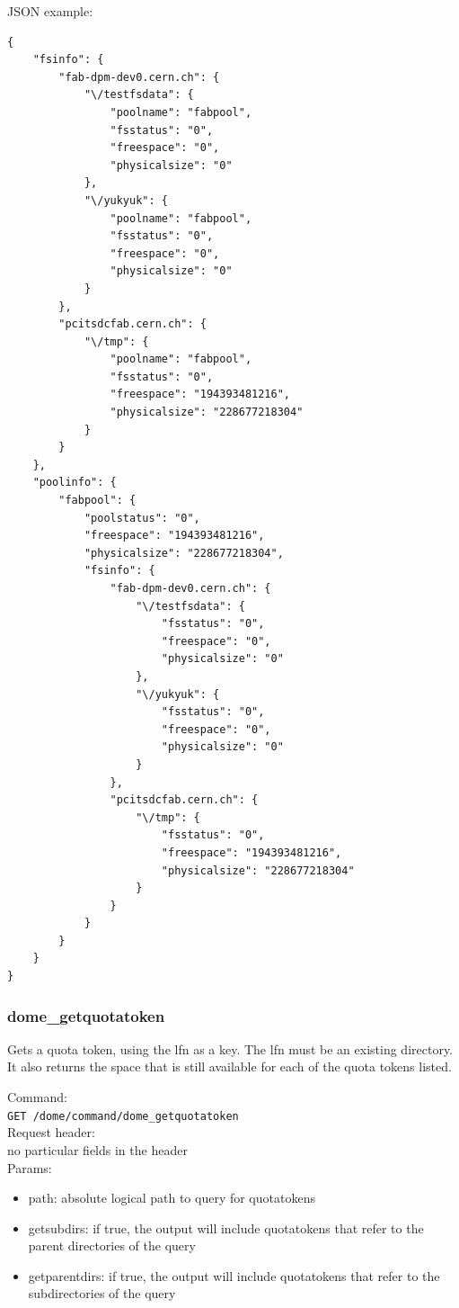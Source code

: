 \documentclass[a4paper,10pt]{scrreprt}
\begin{document}
JSON example:\\
\begin{lstlisting}
{
    "fsinfo": {
        "fab-dpm-dev0.cern.ch": {
            "\/testfsdata": {
                "poolname": "fabpool",
                "fsstatus": "0",
                "freespace": "0",
                "physicalsize": "0"
            },
            "\/yukyuk": {
                "poolname": "fabpool",
                "fsstatus": "0",
                "freespace": "0",
                "physicalsize": "0"
            }
        },
        "pcitsdcfab.cern.ch": {
            "\/tmp": {
                "poolname": "fabpool",
                "fsstatus": "0",
                "freespace": "194393481216",
                "physicalsize": "228677218304"
            }
        }
    },
    "poolinfo": {
        "fabpool": {
            "poolstatus": "0",
            "freespace": "194393481216",
            "physicalsize": "228677218304",
            "fsinfo": {
                "fab-dpm-dev0.cern.ch": {
                    "\/testfsdata": {
                        "fsstatus": "0",
                        "freespace": "0",
                        "physicalsize": "0"
                    },
                    "\/yukyuk": {
                        "fsstatus": "0",
                        "freespace": "0",
                        "physicalsize": "0"
                    }
                },
                "pcitsdcfab.cern.ch": {
                    "\/tmp": {
                        "fsstatus": "0",
                        "freespace": "194393481216",
                        "physicalsize": "228677218304"
                    }
                }
            }
        }
    }
}
\end{lstlisting}

\subsubsection{dome\_getquotatoken}
Gets a quota token, using the lfn as a key. The lfn must be an existing directory.
It also returns the space that is still available for each of the quota tokens listed.

Command:\\
\lstinline"GET /dome/command/dome_getquotatoken"\\

Request header:\\
 no particular fields in the header\\

Params:\\
\begin{itemize}
 \item path: absolute logical path to query for quotatokens
 \item getsubdirs: if true, the output will include quotatokens that refer to the parent directories of the query
 \item getparentdirs: if true, the output will include quotatokens that refer to the subdirectories of the query
\end{itemize}
\end{document}
